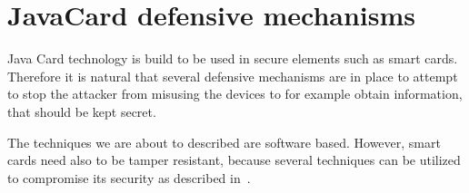         

        
    \section{JavaCard defensive mechanisms}

    Java Card technology is build to be used in secure elements such as smart cards. Therefore it is natural that several defensive mechanisms are in place to attempt to stop the attacker from misusing the devices to for example obtain information, that should be kept secret.

The techniques we are about to described are software based. However, smart cards need also to be tamper resistant, because several techniques can be utilized to compromise its security as described in~\cite{kommerling}.


